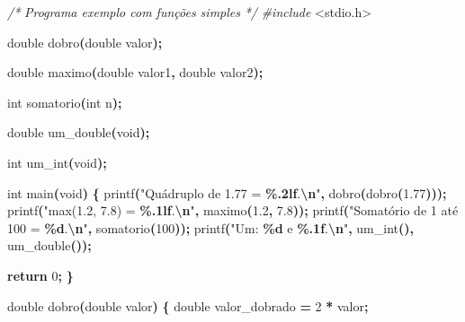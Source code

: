 \documentclass[
  11pt,
  a4paper,
]{scrbook}
\newenvironment{Shaded}{\begin{snugshade}}{\end{snugshade}}
\newcommand{\CommentTok}[1]{\textcolor[rgb]{0.56,0.35,0.01}{\textit{#1}}}
\newcommand{\ControlFlowTok}[1]{\textcolor[rgb]{0.13,0.29,0.53}{\textbf{#1}}}
\newcommand{\DataTypeTok}[1]{\textcolor[rgb]{0.13,0.29,0.53}{#1}}
\newcommand{\DecValTok}[1]{\textcolor[rgb]{0.00,0.00,0.81}{#1}}
\newcommand{\FloatTok}[1]{\textcolor[rgb]{0.00,0.00,0.81}{#1}}
\newcommand{\ImportTok}[1]{#1}
\newcommand{\NormalTok}[1]{#1}
\newcommand{\OperatorTok}[1]{\textcolor[rgb]{0.81,0.36,0.00}{\textbf{#1}}}
\newcommand{\PreprocessorTok}[1]{\textcolor[rgb]{0.56,0.35,0.01}{\textit{#1}}}
\newcommand{\SpecialCharTok}[1]{\textcolor[rgb]{0.81,0.36,0.00}{\textbf{#1}}}
\newcommand{\StringTok}[1]{\textcolor[rgb]{0.31,0.60,0.02}{#1}}
\begin{document}
\begin{Shaded}
\begin{Highlighting}[numbers=left,,]
\CommentTok{/*}
\CommentTok{Programa exemplo com funções simples}
\CommentTok{*/}
\PreprocessorTok{\#include }\ImportTok{\textless{}stdio.h\textgreater{}}

\DataTypeTok{double}\NormalTok{ dobro}\OperatorTok{(}\DataTypeTok{double}\NormalTok{ valor}\OperatorTok{);}

\DataTypeTok{double}\NormalTok{ maximo}\OperatorTok{(}\DataTypeTok{double}\NormalTok{ valor1}\OperatorTok{,} \DataTypeTok{double}\NormalTok{ valor2}\OperatorTok{);}

\DataTypeTok{int}\NormalTok{ somatorio}\OperatorTok{(}\DataTypeTok{int}\NormalTok{ n}\OperatorTok{);}

\DataTypeTok{double}\NormalTok{ um\_double}\OperatorTok{(}\DataTypeTok{void}\OperatorTok{);}

\DataTypeTok{int}\NormalTok{ um\_int}\OperatorTok{(}\DataTypeTok{void}\OperatorTok{);}

\DataTypeTok{int}\NormalTok{ main}\OperatorTok{(}\DataTypeTok{void}\OperatorTok{)} \OperatorTok{\{}
\NormalTok{    printf}\OperatorTok{(}\StringTok{"Quádruplo de 1.77 = }\SpecialCharTok{\%.2lf}\StringTok{.}\SpecialCharTok{\textbackslash{}n}\StringTok{"}\OperatorTok{,}\NormalTok{ dobro}\OperatorTok{(}\NormalTok{dobro}\OperatorTok{(}\FloatTok{1.77}\OperatorTok{)));}
\NormalTok{    printf}\OperatorTok{(}\StringTok{"max(1.2, 7.8) = }\SpecialCharTok{\%.1lf}\StringTok{.}\SpecialCharTok{\textbackslash{}n}\StringTok{"}\OperatorTok{,}\NormalTok{ maximo}\OperatorTok{(}\FloatTok{1.2}\OperatorTok{,} \FloatTok{7.8}\OperatorTok{));}
\NormalTok{    printf}\OperatorTok{(}\StringTok{"Somatório de 1 até 100 = }\SpecialCharTok{\%d}\StringTok{.}\SpecialCharTok{\textbackslash{}n}\StringTok{"}\OperatorTok{,}\NormalTok{ somatorio}\OperatorTok{(}\DecValTok{100}\OperatorTok{));}
\NormalTok{    printf}\OperatorTok{(}\StringTok{"Um: }\SpecialCharTok{\%d}\StringTok{ e }\SpecialCharTok{\%.1f}\StringTok{.}\SpecialCharTok{\textbackslash{}n}\StringTok{"}\OperatorTok{,}\NormalTok{ um\_int}\OperatorTok{(),}\NormalTok{ um\_double}\OperatorTok{());}

    \ControlFlowTok{return} \DecValTok{0}\OperatorTok{;}
\OperatorTok{\}}

\DataTypeTok{double}\NormalTok{ dobro}\OperatorTok{(}\DataTypeTok{double}\NormalTok{ valor}\OperatorTok{)} \OperatorTok{\{}
    \DataTypeTok{double}\NormalTok{ valor\_dobrado }\OperatorTok{=} \DecValTok{2} \OperatorTok{*}\NormalTok{ valor}\OperatorTok{;}


\end{Highlighting}
\end{Shaded}
\end{document}
